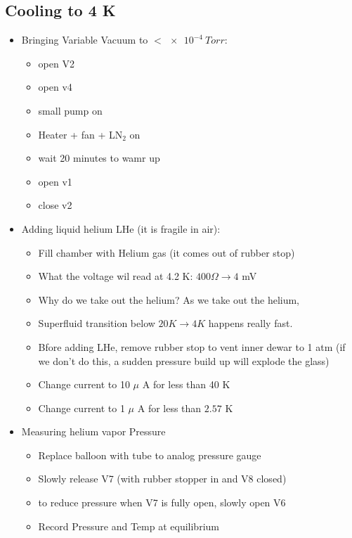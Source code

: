 \documentclass{article}
\begin{document}
\subsection*{Cooling to 4 K}
\begin{itemize}
    \item Bringing Variable Vacuum to $< \qty{e-4}{Torr}$:
    \begin{itemize}
        \item open V2
        \item open v4
        \item small pump on
        \item Heater + fan + LN$_2$ on
        \item wait 20 minutes to wamr up
        \item open v1
        \item close v2
    \end{itemize} 
    \item Adding liquid helium LHe (it is fragile in air):
    \begin{itemize}
        \item Fill chamber with Helium gas (it comes out of rubber stop)
        \item What the voltage wil read at 4.2 K: $400 \Omega \to 4$ mV
        \item Why do we take out the helium? As we take out the helium, 
        \item Superfluid transition below $20 K \to 4K$ happens really fast.
        \item Bfore adding LHe, remove rubber stop to vent inner dewar to 1 atm (if we don't do this, a sudden pressure build up will explode the glass)
        \item Change current to 10 $\mu$ A for less than 40 K
        \item Change current to 1 $\mu$ A for less than $2.57$ K
    \end{itemize}
    \item Measuring helium vapor Pressure
    \begin{itemize}
        \item Replace balloon with tube to analog pressure gauge
        \item Slowly release V7 (with rubber stopper in and V8 closed)
        \item to reduce pressure when V7 is fully open, slowly open V6
        \item Record Pressure and Temp at equilibrium
    \end{itemize}
\end{itemize}
\end{document}
